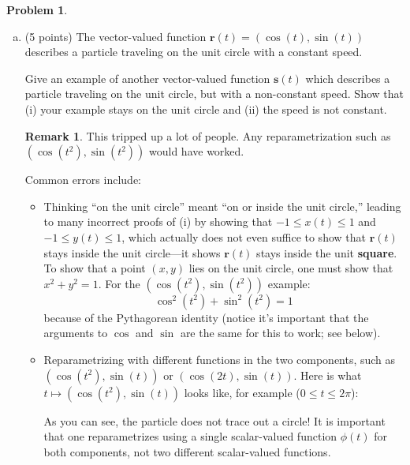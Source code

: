 \documentclass[11pt,oneside]{amsart}
\theoremstyle{definition}
\newtheorem{problem}{Problem}
\newtheorem*{remark}{Remark}
\theoremstyle{plain}
\newcommand{\br}{{\mathbf{r}}}
\newcommand{\bs}{{\mathbf{s}}}
\begin{document}
\begin{problem}\leavevmode
  \begin{enumerate}[(a)]
    \item (5 points) The vector-valued function $\br(t)=(\cos(t),\sin(t))$ describes a particle traveling on the unit circle with a constant speed.

    Give an example of another vector-valued function $\bs(t)$ which describes a particle traveling on the unit circle, but with a non-constant speed. Show that (i) your example stays on the unit circle and (ii) the speed is not constant.
    \begin{remark}\color{blue}
      This tripped up a lot of people. Any reparametrization such as $(\cos(t^2),\sin(t^2))$ would have worked.

      Common errors include:
      \begin{itemize}
        \item Thinking ``on the unit circle'' meant ``on or inside the unit circle,'' leading to many incorrect proofs of (i) by showing that $-1\leq x(t)\leq 1$ and $-1\leq y(t)\leq 1$, which actually does not even suffice to show that $\br(t)$ stays inside the unit circle---it shows $\br(t)$ stays inside the unit \textbf{square}. To show that a point $(x,y)$ lies on the unit circle, one must show that $x^2+y^2=1$. For the $(\cos(t^2),\sin(t^2))$ example:
        \[\cos^2(t^2)+\sin^2(t^2)=1\]
        because of the Pythagorean identity (notice it's important that the arguments to $\cos$ and $\sin$ are the same for this to work; see below).
        \item Reparametrizing with different functions in the two components, such as $(\cos(t^2),\sin(t))$ or $(\cos(2t),\sin(t))$. Here is what $t\mapsto(\cos(t^2),\sin(t))$ looks like, for example ($0\leq t\leq 2\pi$):
        \begin{center}
        \end{center}
        As you can see, the particle does not trace out a circle! It is important that one reparametrizes using a single scalar-valued function $\phi(t)$ for both components, not two different scalar-valued functions.

\end{itemize}
\end{remark}
\end{enumerate}
\end{problem}
\end{document}
